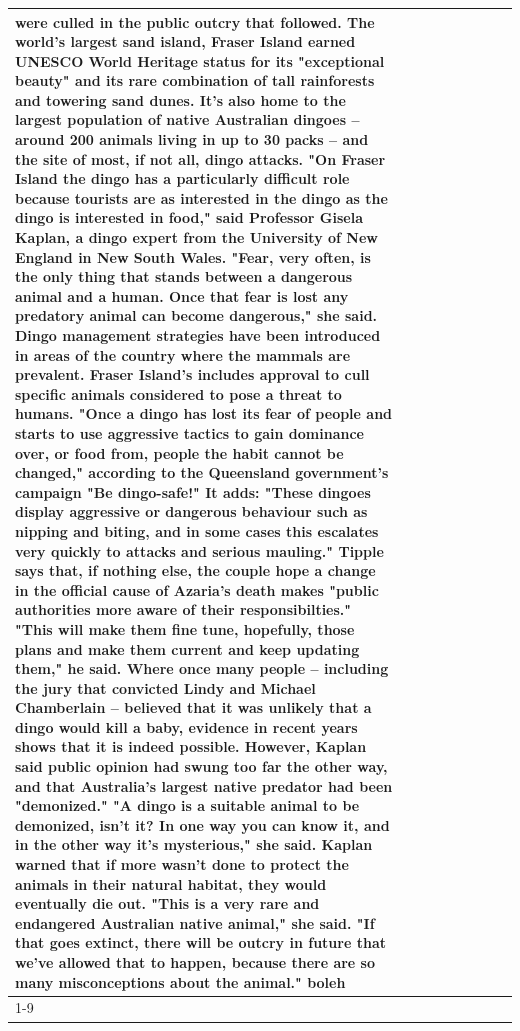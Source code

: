 \begin{table}[H]
\begin{tabular}{lllrlllll}
were culled in the public outcry that followed. The world's largest sand island, Fraser Island earned UNESCO World Heritage status for its "exceptional beauty" and its rare combination of tall rainforests and towering sand dunes. It's also home to the largest population of native Australian dingoes -- around 200 animals living in up to 30 packs -- and the site of most, if not all, dingo attacks. "On Fraser Island the dingo has a particularly difficult role because tourists are as interested in the dingo as the dingo is interested in food," said Professor Gisela Kaplan, a dingo expert from the University of New England in New South Wales. "Fear, very often, is the only thing that stands between a dangerous animal and a human. Once that fear is lost any predatory animal can become dangerous," she said. Dingo management strategies have been introduced in areas of the country where the mammals are prevalent. Fraser Island's includes approval to cull specific animals considered to pose a threat to humans. "Once a dingo has lost its fear of people and starts to use aggressive tactics to gain dominance over, or food from, people the habit cannot be changed," according to the Queensland government's campaign "Be dingo-safe!" It adds: "These dingoes display aggressive or dangerous behaviour such as nipping and biting, and in some cases this escalates very quickly to attacks and serious mauling." Tipple says that, if nothing else, the couple hope a change in the official cause of Azaria's death makes "public authorities more aware of their responsibilties." "This will make them fine tune, hopefully, those plans and make them current and keep updating them," he said. Where once many people -- including the jury that convicted Lindy and Michael Chamberlain -- believed that it was unlikely that a dingo would kill a baby, evidence in recent years shows that it is indeed possible. However, Kaplan said public opinion had swung too far the other way, and that Australia's largest native predator had been "demonized." "A dingo is a suitable animal to be demonized, isn't it? In one way you can know it, and in the other way it's mysterious," she said. Kaplan warned that if more wasn't done to protect the animals in their natural habitat, they would eventually die out. "This is a very rare and endangered Australian native animal," she said. "If that goes extinct, there will be outcry in future that we've allowed that to happen, because there are so many misconceptions about the animal." boleh \\
\cline{1-9}

\end{tabular}
\end{table}
